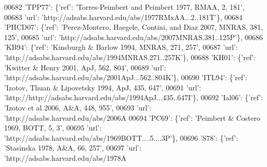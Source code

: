 \begin{DoxyCode}
00682                              \textcolor{stringliteral}{'TPP77'}: \{\textcolor{stringliteral}{'ref'}: \textcolor{stringliteral}{'Torres-Peimbert and Peimbert 1977, RMAA, 2, 181'},
00683                                        \textcolor{stringliteral}{'url'}: \textcolor{stringliteral}{'http://adsabs.harvard.edu/abs/1977RMxAA...2..181T'}\},
00684                              \textcolor{stringliteral}{'PHCD07'}: \{\textcolor{stringliteral}{'ref'}: \textcolor{stringliteral}{'Perez-Montero, Haegele, Contini, and Diaz 2007, MNRAS, 381,
       125'},
00685                                         \textcolor{stringliteral}{'url'}: \textcolor{stringliteral}{'http://adsabs.harvard.edu/abs/2007MNRAS.381..125P'}\},
00686                              \textcolor{stringliteral}{'KB94'}: \{\textcolor{stringliteral}{'ref'}: \textcolor{stringliteral}{'Kinsburgh & Barlow 1994, MNRAS, 271, 257'},
00687                                       \textcolor{stringliteral}{'url'}: \textcolor{stringliteral}{'http://adsabs.harvard.edu/abs/1994MNRAS.271..257K'}\},
00688                              \textcolor{stringliteral}{'KH01'}: \{\textcolor{stringliteral}{'ref'}: \textcolor{stringliteral}{'Kwitter & Henry 2001, ApJ, 562, 804'},
00689                                       \textcolor{stringliteral}{'url'}: \textcolor{stringliteral}{'http://adsabs.harvard.edu/abs/2001ApJ...562..804K'}\},
00690                              \textcolor{stringliteral}{'ITL94'}: \{\textcolor{stringliteral}{'ref'}: \textcolor{stringliteral}{'Izotov, Thuan & Lipovetsky 1994, ApJ, 435, 647'},
00691                                        \textcolor{stringliteral}{'url'}: \textcolor{stringliteral}{'http://http://adsabs.harvard.edu/abs/1994ApJ...435..647I'}\},
00692                              \textcolor{stringliteral}{'Ial06'}: \{\textcolor{stringliteral}{'ref'}: \textcolor{stringliteral}{'Izotov et al 2006, A&A, 448, 955'},
00693                                        \textcolor{stringliteral}{'url'}: \textcolor{stringliteral}{'http://adsabs.harvard.edu/abs/2006A%
00694                              \textcolor{stringliteral}{'PC69'}: \{\textcolor{stringliteral}{'ref'}: \textcolor{stringliteral}{'Peimbert & Costero 1969, BOTT, 5, 3'},
00695                                       \textcolor{stringliteral}{'url'}: \textcolor{stringliteral}{'http://adsabs.harvard.edu/abs/1969BOTT....5....3P'}\},
00696                              \textcolor{stringliteral}{'S78'}: \{\textcolor{stringliteral}{'ref'}: \textcolor{stringliteral}{'Stasinska 1978, A&A, 66, 257'},
00697                                      \textcolor{stringliteral}{'url'}: \textcolor{stringliteral}{'http://adsabs.harvard.edu/abs/1978A%
}}
\end{DoxyCode}
